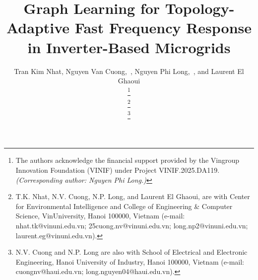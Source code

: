\documentclass[lettersize,journal]{IEEEtran}
\begin{document}
\title{Graph Learning for Topology-Adaptive Fast Frequency Response in Inverter-Based Microgrids}


\author{Tran Kim Nhat, Nguyen Van Cuong,~, Nguyen Phi Long,~, and Laurent El Ghaoui
	
	
	\thanks{The authors acknowledge the financial support provided by the Vingroup Innovation Foundation (VINIF) under Project VINIF.2025.DA119. \textit{(Corresponding author: Nguyen Phi Long.)}}
		
	\thanks{T.K. Nhat, N.V. Cuong, N.P. Long, and Laurent El Ghaoui, are with Center for Environmental Intelligence and College of Engineering \& Computer Science, VinUniversity, Hanoi 100000, Vietnam (e-mail: nhat.tk@vinuni.edu.vn; 25cuong.nv@vinuni.edu.vn; long.np2@vinuni.edu.vn; laurent.eg@vinuni.edu.vn).}
	
	\thanks{N.V. Cuong and N.P. Long are also with School of Electrical and Electronic Engineering, Hanoi University of Industry, Hanoi 100000, Vietnam (e-mail: cuongnv@haui.edu.vn; long.nguyen04@haui.edu.vn).}
}





\maketitle
\end{document}

